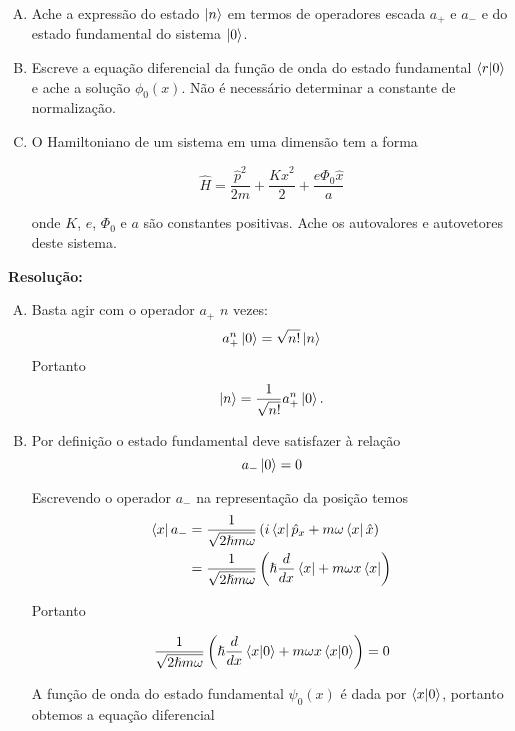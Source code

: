 \documentclass[a4paper, 12pt, notitlepage]{article}
\begin{document}
\begin{enumerate}
\begin{enumerate}[(A)]
  \item Ache a expressão do estado $\ket{n}$ em termos de operadores escada $a_+$ e $a_-$ e do estado fundamental do sistema $\ket{0}$.
  \item Escreve a equação diferencial da função de onda do estado fundamental $\bra{r}\ket{0}$ e ache a solução $\phi_0(x)$. Não é necessário determinar a constante de normalização.
  \item O Hamiltoniano de um sistema em uma dimensão tem a forma
  
  \[ \hat{H} = \frac{\hat{p}^2}{2m} + \frac{K\hat{x}^2}{2} + \frac{e\Phi_0\hat{x}}{a} \]
  
  \noindent onde $K$, $e$, $\Phi_0$ e $a$ são constantes positivas. Ache os autovalores e autovetores deste sistema.
\end{enumerate}

\textbf{Resolução:}
\begin{enumerate}[(A)]
  \item Basta agir com o operador $a_+$ $n$ vezes:
  \begin{equation*}
    a_+^n \ket{0} = \sqrt{n!} \ket{n}
  \end{equation*}
  Portanto
  \begin{equation*}
    \ket{n} = \frac{1}{\sqrt{n!}} a_+^n \ket{0}.
  \end{equation*}
  
  \item Por definição o estado fundamental deve satisfazer à relação
  \begin{equation*}
    a_- \ket{0} = 0
  \end{equation*}

   Escrevendo o operador $a_-$ na representação da posição temos
  \begin{align*}
    \bra{x}a_- &= \frac{1}{\sqrt{2\hslash m \omega}} \left(i\bra{x}\hat{p}_x + m\omega\bra{x}\hat{x} \right) \\
    &= \frac{1}{\sqrt{2\hslash m \omega}} \left(\hslash \frac{d}{dx} \bra{x} + m\omega x \bra{x} \right)
  \end{align*}
  
  Portanto
  
  \begin{equation*}
    \frac{1}{\sqrt{2\hslash m \omega}} \left(\hslash \frac{d}{dx} \bra{x}\ket{0} + m\omega x \bra{x}\ket{0} \right) = 0
  \end{equation*}
  
  A função de onda do estado fundamental $\psi_0(x)$ é dada por $\bra{x}\ket{0}$, portanto obtemos a equação diferencial
  

\end{enumerate}
\end{enumerate}
\end{document}
